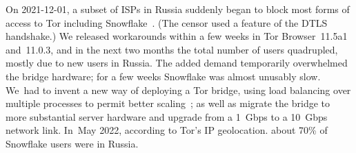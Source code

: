 \documentclass[letterpaper,twocolumn]{article}
\begin{document}
On \mbox{2021-12-01}, a subset of ISPs in Russia suddenly began to block
most forms of access to Tor
including Snowflake~\cite{ooni-2021-russia-blocks-tor}.
(The censor used a feature of the DTLS handshake.)
We released workarounds within a few weeks in
Tor Browser~11.5a1 and~11.0.3,
and in the next two months the total number of users quadrupled,
mostly due to new users in Russia.
The added demand temporarily overwhelmed the bridge hardware;
for a few weeks Snowflake was almost unusably slow.
We~had to invent a new way of deploying a Tor bridge,
using load balancing over multiple processes to permit better scaling~\cite{Fifield2023a};
as well as migrate the bridge to more substantial server hardware
and upgrade from a 1~Gbps to a 10~Gbps network link.
In~May 2022, according to Tor's IP geolocation.
about 70\% of Snowflake users were in Russia.
\end{document}
